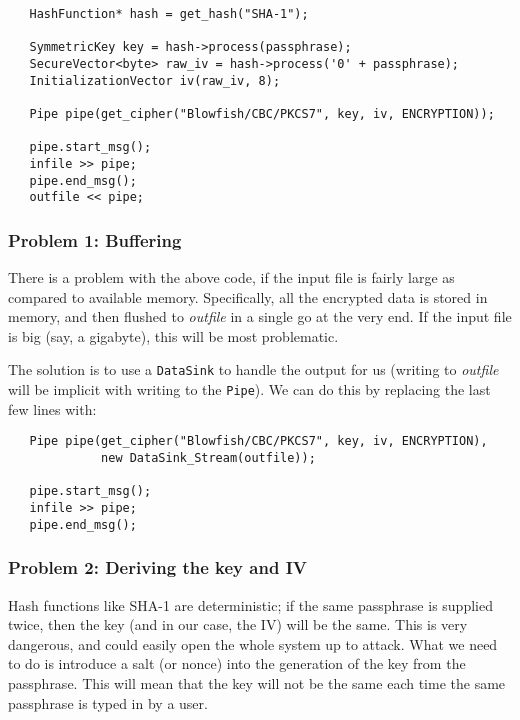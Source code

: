 \documentclass{article}
\newcommand{\type}[1]{\texttt{#1}}
\renewcommand{\arg}[1]{\textsl{#1}}
\newcommand{\variable}[1]{\textsl{#1}}
\begin{document}
\begin{verbatim}
   HashFunction* hash = get_hash("SHA-1");

   SymmetricKey key = hash->process(passphrase);
   SecureVector<byte> raw_iv = hash->process('0' + passphrase);
   InitializationVector iv(raw_iv, 8);

   Pipe pipe(get_cipher("Blowfish/CBC/PKCS7", key, iv, ENCRYPTION));

   pipe.start_msg();
   infile >> pipe;
   pipe.end_msg();
   outfile << pipe;
\end{verbatim}

\subsubsection{Problem 1: Buffering}

There is a problem with the above code, if the input file is fairly large as
compared to available memory. Specifically, all the encrypted data is stored
in memory, and then flushed to \variable{outfile} in a single go at the very
end. If the input file is big (say, a gigabyte), this will be most problematic.

The solution is to use a \type{DataSink} to handle the output for us (writing
to \arg{outfile} will be implicit with writing to the \type{Pipe}). We can do
this by replacing the last few lines with:

\begin{verbatim}
   Pipe pipe(get_cipher("Blowfish/CBC/PKCS7", key, iv, ENCRYPTION),
             new DataSink_Stream(outfile));

   pipe.start_msg();
   infile >> pipe;
   pipe.end_msg();
\end{verbatim}

\subsubsection{Problem 2: Deriving the key and IV}

Hash functions like SHA-1 are deterministic; if the same passphrase is supplied
twice, then the key (and in our case, the IV) will be the same. This is very
dangerous, and could easily open the whole system up to attack. What we need to
do is introduce a salt (or nonce) into the generation of the key from the
passphrase. This will mean that the key will not be the same each time the same
passphrase is typed in by a user.
\end{document}
